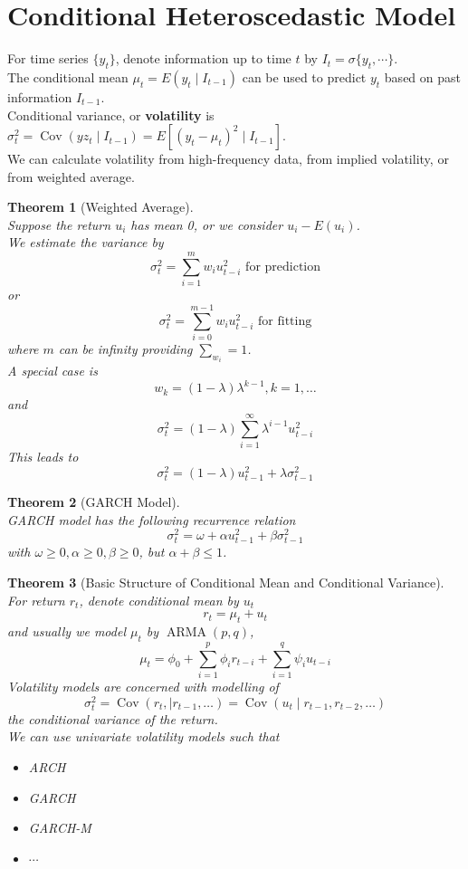 \documentclass[12pt]{article}
\newtheorem{theorem}{Theorem}[section]
\theoremstyle{definition}
\DeclareMathOperator{\cov}{Cov}
\DeclareMathOperator{\ARMA}{ARMA}
\begin{document}
\section{Conditional Heteroscedastic Model}
For time series $\{y_t\}$, denote information up to time $t$ by $I_t = \sigma\{y_t, \cdots\}$.\\
The conditional mean $\mu_t = E(y_t\mid I_{t-1})$ can be used to predict $y_t$ based on past information $I_{t-1}$.\\
Conditional variance, or \textbf{volatility} is $\sigma^2_t = \cov(yz_t\mid I_{t-1}) = E[(y_t-\mu_t)^2\mid I_{t-1}]$.\\
We can calculate volatility from high-frequency data, from implied volatility, or from weighted average.
\begin{theorem}[Weighted Average]
\hfill\\\normalfont Suppose the return $u_i$ has mean 0, or we consider $u_i-E(u_i)$.\\
We estimate the variance by
\[
\sigma_t^2 = \sum_{i=1}^m w_i u_{t-i}^2\text{ for prediction}
\]
or
\[
\sigma_t^2 = \sum_{i=0}^{m-1}w_i u_{t-i}^2\text{ for fitting}
\]
where $m$ can be infinity providing $\sum_{w_i}=1$.\\
A special case is
\[
w_k = (1-\lambda)\lambda^{k-1}, k = 1,\ldots
\]
and
\[
\sigma_t^2 = (1-\lambda)\sum_{i=1}^\infty \lambda^{i-1}u_{t-i}^2
\]
This leads to 
\[
\sigma_t^2 = (1-\lambda)u_{t-1}^2 + \lambda \sigma_{t-1}^2
\]
\end{theorem}
\begin{theorem}[GARCH Model]
\hfill\\\normalfont GARCH model has the following recurrence relation
\[
\sigma^2_t = \omega + \alpha u_{t-1}^2 + \beta \sigma^2_{t-1}
\]
with $\omega\geq 0, \alpha \geq 0, \beta \geq 0$, but $\alpha+\beta\leq1$.
\end{theorem}
\begin{theorem}[Basic Structure of Conditional Mean and Conditional Variance]
\hfill\\\normalfont For return $r_t$, denote conditional mean by $u_t$
\[
r_t= \mu_t + u_t
\]
and usually we model $\mu_t$ by $\ARMA(p,q)$,
\[
\mu_t = \phi_0 + \sum_{i=1}^p \phi_i r_{t-i} + \sum_{i=1}^q \psi_i u_{t-i}
\]
Volatility models are concerned with modelling of
\[
\sigma_t^2  = \cov(r_t, \mid r_{t-1}, \ldots) = \cov(u_t\mid r_{t-1}, r_{t-2},\ldots)
\]
the conditional variance of the return.\\
We can use univariate volatility models such that
\begin{itemize}
  \item ARCH
  \item GARCH
  \item GARCH-M
  \item $\cdots$
\end{itemize}
\end{theorem}
\end{document}

